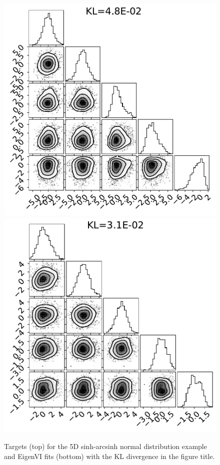 \begin{figure}[t]
    \includegraphics[scale=0.28]{figs/expts-2d/sinh_5D_target2-fit.pdf}
    \includegraphics[scale=0.28]{figs/expts-2d/sinh_5D_target3-fit.pdf}
\caption{Targets (top) for the 5D sinh-arcsinh normal distribution example
and EigenVI fits (bottom) with the KL divergence in the figure title.}
\label{fig:5dtargetdensity}
\end{figure}

